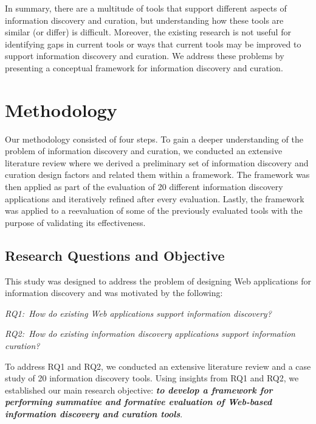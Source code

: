 \documentclass{sigchi}
\begin{document}
In summary, there are a multitude of tools that support different aspects of information discovery and curation, but understanding how these tools are similar (or differ) is difficult. Moreover, the existing research is not useful for identifying gaps in current tools or ways that current tools may be improved to support information discovery and curation. We address these problems by presenting a conceptual framework for information discovery and curation.

\section{Methodology}
\label{section:methodology}
Our methodology consisted of four steps. To gain a deeper understanding of the problem of information discovery and curation, we conducted an extensive literature review where we derived a preliminary set of information discovery and curation design factors and related them within a framework. The framework was then applied as part of the evaluation of 20 different information discovery applications and iteratively refined after every evaluation. Lastly, the framework was applied to a reevaluation of some of the previously evaluated tools with the purpose of validating its effectiveness. 

{\subsection{Research Questions and Objective}
This study was designed to address the problem of designing Web applications for information discovery and was motivated by the following:

\emph{RQ1:~How do existing Web applications support information discovery?}

\emph{RQ2:~How do existing information discovery applications support information curation?}

To address RQ1 and RQ2, we conducted an extensive literature review and a case study of 20 information discovery tools. Using insights from RQ1 and RQ2, we established our main research objective: \emph{\textbf{to develop a framework for performing summative and formative evaluation of Web-based information discovery and curation tools}}.

}%
\end{document}
